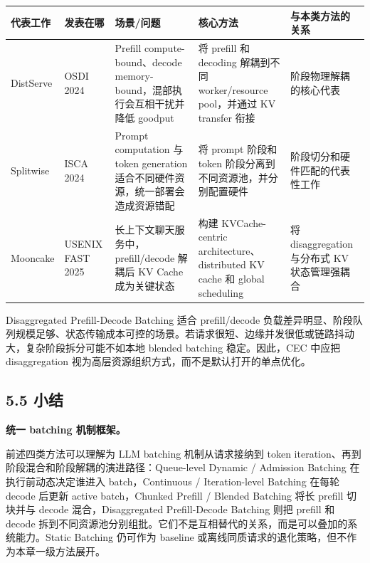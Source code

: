 \documentclass[a4paper,10pt]{ctexart}
\begin{document}
\begin{table}[H]
\centering
\scriptsize
\setlength{\tabcolsep}{3pt}
\renewcommand{\arraystretch}{1.15}
\begin{tabularx}{\textwidth}{|X|X|X|X|X|}
\hline
\textbf{代表工作} & \textbf{发表在哪} & \textbf{场景/问题} & \textbf{核心方法} & \textbf{与本类方法的关系} \\ \hline
DistServe & OSDI 2024 & Prefill compute-bound、decode memory-bound，混部执行会互相干扰并降低 goodput & 将 prefill 和 decoding 解耦到不同 worker/resource pool，并通过 KV transfer 衔接 & 阶段物理解耦的核心代表 \\ \hline
Splitwise & ISCA 2024 & Prompt computation 与 token generation 适合不同硬件资源，统一部署会造成资源错配 & 将 prompt 阶段和 token 阶段分离到不同资源池，并分别配置硬件 & 阶段切分和硬件匹配的代表性工作 \\ \hline
Mooncake & USENIX FAST 2025 & 长上下文聊天服务中，prefill/decode 解耦后 KV Cache 成为关键状态 & 构建 KVCache-centric architecture、distributed KV cache 和 global scheduling & 将 disaggregation 与分布式 KV 状态管理强耦合 \\ \hline
\end{tabularx}
\end{table}




Disaggregated Prefill-Decode Batching 适合 prefill/decode 负载差异明显、阶段队列规模足够、状态传输成本可控的场景。若请求很短、边缘并发很低或链路抖动大，复杂阶段拆分可能不如本地 blended batching 稳定。因此，CEC 中应把 disaggregation 视为高层资源组织方式，而不是默认打开的单点优化。


\subsection*{5.5 小结}

\textbf{统一 batching 机制框架。}


前述四类方法可以理解为 LLM batching 机制从请求接纳到 token iteration、再到阶段混合和阶段解耦的演进路径：Queue-level Dynamic / Admission Batching 在执行前动态决定谁进入 batch，Continuous / Iteration-level Batching 在每轮 decode 后更新 active batch，Chunked Prefill / Blended Batching 将长 prefill 切块并与 decode 混合，Disaggregated Prefill-Decode Batching 则把 prefill 和 decode 拆到不同资源池分别组批。它们不是互相替代的关系，而是可以叠加的系统能力。Static Batching 仍可作为 baseline 或离线同质请求的退化策略，但不作为本章一级方法展开。
\end{document}
